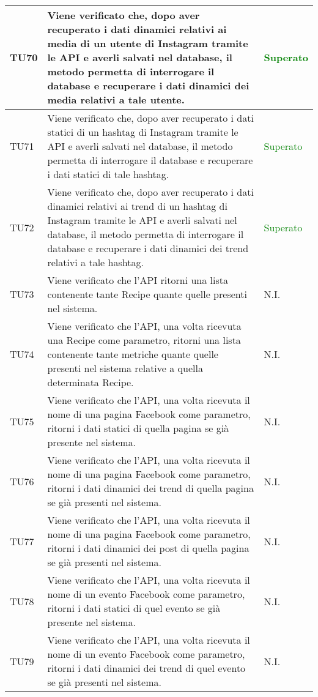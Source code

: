 \begin{center}
\begin{longtable}{| p{2cm} | p{8cm} | p{2.5cm} |}
					\hline	
					TU70 & Viene verificato che, dopo aver recuperato i dati dinamici relativi ai media di un utente di Instagram tramite le API e averli salvati nel database, il metodo permetta di interrogare il database e recuperare i dati dinamici dei media relativi a tale utente. & \textcolor{green}{Superato}\\
					\hline
					TU71 & Viene verificato che, dopo aver recuperato i dati statici di un hashtag di Instagram tramite le API e averli salvati nel database, il metodo permetta di interrogare il database e recuperare i dati statici di tale hashtag. & \textcolor{green}{Superato}\\
					\hline	
					TU72 & Viene verificato che, dopo aver recuperato i dati dinamici relativi ai trend di un hashtag di Instagram tramite le API e averli salvati nel database, il metodo permetta di interrogare il database e recuperare i dati dinamici dei trend relativi a tale hashtag. & \textcolor{green}{Superato}\\
					\hline	
					TU73 & Viene verificato che l'API ritorni una lista contenente tante Recipe quante quelle presenti nel sistema. & N.I.\\
					\hline
					TU74 & Viene verificato che l'API, una volta ricevuta una Recipe come parametro, ritorni una lista contenente tante metriche quante quelle presenti nel sistema relative a quella determinata Recipe. & N.I.\\
					\hline
					TU75 & Viene verificato che l'API, una volta ricevuta il nome di una pagina Facebook come parametro, ritorni i dati statici di quella pagina se già presente nel sistema. & N.I.\\
					\hline
					TU76 & Viene verificato che l'API, una volta ricevuta il nome di una pagina Facebook come parametro, ritorni i dati dinamici dei trend di quella pagina se già presenti nel sistema. & N.I.\\
					\hline
					TU77 & Viene verificato che l'API, una volta ricevuta il nome di una pagina Facebook come parametro, ritorni i dati dinamici dei post di quella pagina se già presenti nel sistema. & N.I.\\
					\hline
					TU78 & Viene verificato che l'API, una volta ricevuta il nome di un evento Facebook come parametro, ritorni i dati statici di quel evento se già presente nel sistema. & N.I.\\
					\hline
					TU79 & Viene verificato che l'API, una volta ricevuta il nome di un evento Facebook come parametro, ritorni i dati dinamici dei trend di quel evento se già presenti nel sistema. & N.I.\\

\end{longtable}
\end{center}
